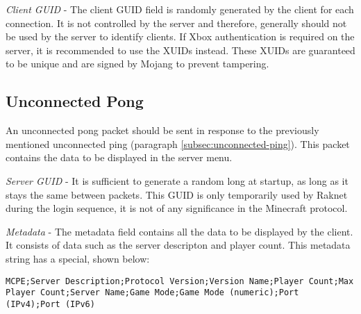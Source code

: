 
\textit{Client GUID} - The client GUID field is randomly generated by the client for each connection.
It is not controlled by the server and therefore, generally should not be used by the server to identify clients.
If Xbox authentication is required on the server, it is recommended to use the XUIDs instead.
These XUIDs are guaranteed to be unique and are signed by Mojang to prevent tampering.

\subsection{Unconnected Pong}\label{subsec:unconnected-pong}

An unconnected pong packet should be sent in response to the previously mentioned unconnected ping (paragraph \ref{subsec:unconnected-ping}).
This packet contains the data to be displayed in the server menu.


\textit{Server GUID} - It is sufficient to generate a random long at startup, as long as it stays the same between packets.
This GUID is only temporarily used by Raknet during the login sequence, it is not of any significance in the Minecraft protocol.

\textit{Metadata} - The metadata field contains all the data to be displayed by the client.
It consists of data such as the server descripton and player count.
This metadata string has a special, shown below:

\texttt{MCPE;Server Description;Protocol Version;Version Name;Player Count;Max Player Count;Server Name;Game Mode;Game Mode (numeric);Port (IPv4);Port (IPv6)}

